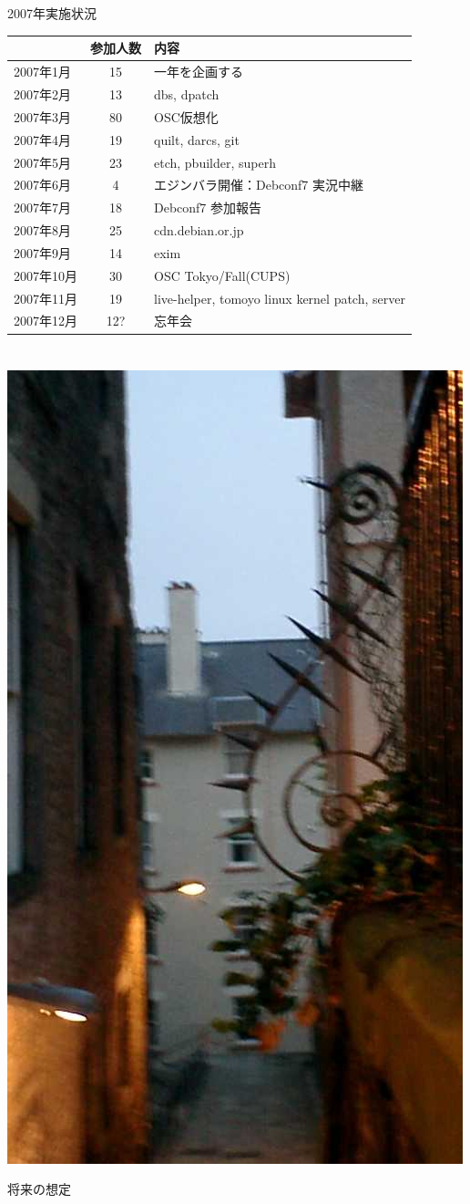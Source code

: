 \documentclass[cjk,dvipdfmx,12pt]{beamer}
\newcommand{\emtext}[1]{
\begin{frame}{}

\begin{minipage}{0.55\hsize}
\includegraphics[width=1\hsize]{image200707/gurutitle.jpg}
\end{minipage}
\begin{minipage}{0.39\hsize}
 {\Huge #1
 }
\end{minipage}
\end{frame}
}
\begin{document}
\section{}
\begin{frame}{2007年実施状況}
  \begin{tabular}{|l|c|p{10em}|}

 & 参加人数 & 内容\\
 \hline
2007年1月 & 15 & 一年を企画する \\
2007年2月 & 13 & dbs, dpatch\\
2007年3月 & 80 & OSC仮想化 \\
2007年4月 & 19 & quilt, darcs, git\\
2007年5月 & 23 & etch, pbuilder, superh \\
2007年6月 & 4 & エジンバラ開催：Debconf7 実況中継 \\
2007年7月 & 18 & Debconf7 参加報告\\
2007年8月 & 25 & cdn.debian.or.jp \\
2007年9月 & 14 & exim \\
2007年10月 & 30 & OSC Tokyo/Fall(CUPS) \\
2007年11月 & 19 & live-helper, tomoyo linux kernel patch, server\\
2007年12月 & 12? & 忘年会\\
 \hline
  \end{tabular}
\end{frame}

\section{}
\emtext{将来の想定}

\section{}
\end{document}
